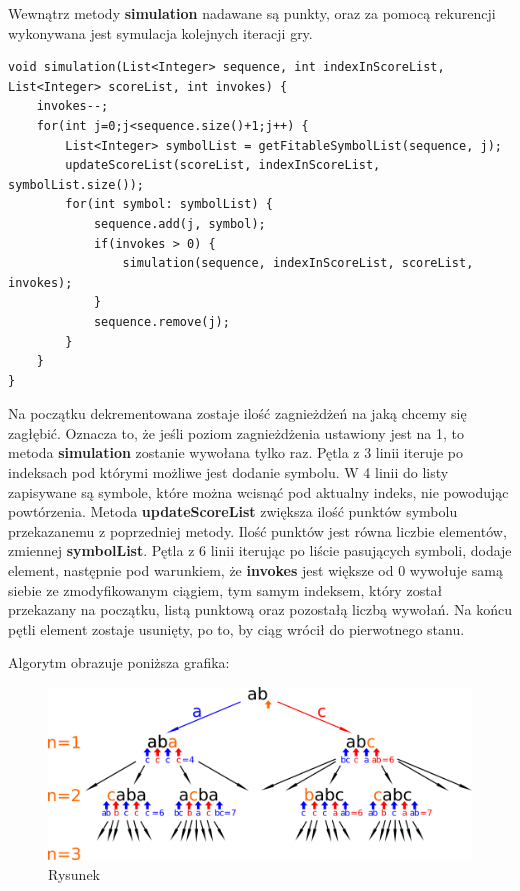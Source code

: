 \documentclass[document]{xmgr}
\begin{document}
Wewnątrz metody \textbf{simulation} nadawane są punkty, oraz za pomocą rekurencji wykonywana jest symulacja kolejnych iteracji gry.

\begin{lstlisting}[frame=single]
void simulation(List<Integer> sequence, int indexInScoreList, List<Integer> scoreList, int invokes) {
	invokes--;
	for(int j=0;j<sequence.size()+1;j++) {
		List<Integer> symbolList = getFitableSymbolList(sequence, j);
		updateScoreList(scoreList, indexInScoreList, symbolList.size());
		for(int symbol: symbolList) {
			sequence.add(j, symbol);
			if(invokes > 0) {
				simulation(sequence, indexInScoreList, scoreList, invokes);
			}
			sequence.remove(j);
		}
	}
}
\end{lstlisting}

Na początku dekrementowana zostaje ilość zagnieżdżeń na jaką chcemy się zagłębić. Oznacza to, że jeśli poziom zagnieżdżenia ustawiony jest na 1, to metoda \textbf{simulation} zostanie wywołana tylko raz. Pętla z 3 linii iteruje po indeksach pod którymi możliwe jest dodanie symbolu. W 4 linii do listy zapisywane są symbole, które można wcisnąć pod aktualny indeks, nie powodując powtórzenia. Metoda \textbf{updateScoreList} zwiększa ilość punktów symbolu przekazanemu z poprzedniej metody. Ilość punktów jest równa liczbie elementów, zmiennej \textbf{symbolList}. Pętla z 6 linii iterując po liście pasujących symboli, dodaje element, następnie pod warunkiem, że \textbf{invokes} jest większe od 0 wywołuje samą siebie ze zmodyfikowanym ciągiem, tym samym indeksem, który został przekazany na początku, listą punktową oraz pozostałą liczbą wywołań. Na końcu pętli element zostaje usunięty, po to, by ciąg wrócił do pierwotnego stanu.

Algorytm obrazuje poniższa grafika:


\begin{figure}[h]
    \centering
    \includegraphics[scale = 0.08]{images/nestingPainter}
    \caption{Rysunek}
    \label{fig:mesh12}
\end{figure}
\end{document}
